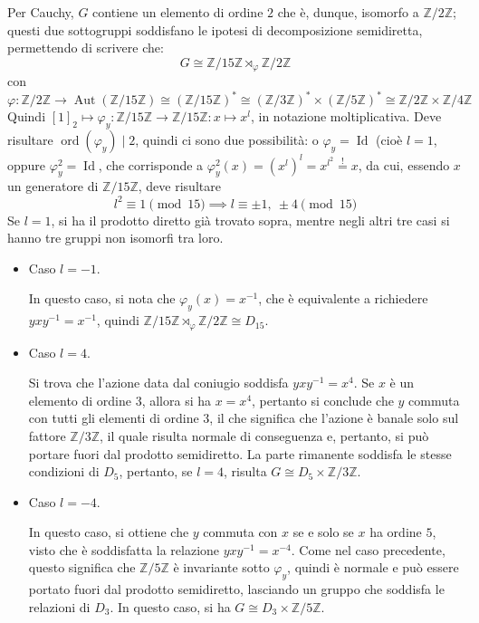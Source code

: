 \documentclass[11pt]{article}
\theoremstyle{style}
\numberwithin{equation}{subsection}
\begin{document}
Per Cauchy, $G$ contiene un elemento di ordine $2$ che \`e, dunque, isomorfo a $\mathbb{Z}/2\mathbb{Z}$; questi due sottogruppi soddisfano le ipotesi di decomposizione semidiretta, permettendo di scrivere che:
\[
G \cong \mathbb{Z}/15\mathbb{Z} \rtimes _\varphi  \mathbb{Z}/2\mathbb{Z}
\] 
con
\[
\varphi :\mathbb{Z}/2\mathbb{Z} \longrightarrow \operatorname{Aut} (\mathbb{Z}/15\mathbb{Z}) \cong (\mathbb{Z}/15\mathbb{Z})^*\cong (\mathbb{Z}/3\mathbb{Z})^* \times (\mathbb{Z}/5\mathbb{Z})^*\cong \mathbb{Z}/2\mathbb{Z} \times \mathbb{Z}/4\mathbb{Z}
\] 
Quindi $[1]_2\mapsto \varphi _y:\mathbb{Z}/15\mathbb{Z}\longrightarrow \mathbb{Z}/15\mathbb{Z} : x\longmapsto x^{l}$, in notazione moltiplicativa. 
Deve risultare $\operatorname{ord}(\varphi _y)  \mid 2$, quindi ci sono due possibilit\`a: o $\varphi _y = \operatorname{Id} $ (cio\`e $l=1$, oppure $\varphi _y^2 = \operatorname{Id} $, che corrisponde a $\varphi ^2_y (x) = (x^l)^l= x^{l^2} \stackrel{!}{=} x$, da cui, essendo $x$ un generatore di $\mathbb{Z}/15\mathbb{Z}$, deve risultare 
\[
l^2 \equiv 1 \pmod{15} \implies l \equiv \pm 1, \ \pm 4 \pmod{15} 
\] 
Se $l=1$, si ha il prodotto diretto gi\`a trovato sopra, mentre negli altri tre casi si hanno tre gruppi non isomorfi tra loro.
\begin{itemize}
	\item Caso $l=-1$.

		In questo caso, si nota che $\varphi _y(x) = x^{-1}$, che \`e equivalente a richiedere $yxy^{-1} = x^{-1}$, quindi $\mathbb{Z}/15\mathbb{Z}\rtimes _\varphi \mathbb{Z}/2\mathbb{Z}\cong D_{15}$.
	\item Caso $l = 4$.

		Si trova che l'azione data dal coniugio soddisfa $yxy^{-1}=x^4$.
		Se $x$ \`e un elemento di ordine $3$, allora si ha $x = x^4$, pertanto si conclude che $y$ commuta con tutti gli elementi di ordine $3$, il che significa che l'azione \`e banale solo sul fattore $\mathbb{Z}/3\mathbb{Z}$, il quale risulta normale di conseguenza e, pertanto, si pu\`o portare fuori dal prodotto semidiretto.
		La parte rimanente soddisfa le stesse condizioni di $D_5$, pertanto, se $l=4$, risulta $G\cong D_5\times \mathbb{Z}/3\mathbb{Z}$.
	\item Caso $l=-4$.

		In questo caso, si ottiene che $y$ commuta con $x$ se e solo se $x$ ha ordine $5$, visto che \`e soddisfatta la relazione $yxy^{-1}=x^{-4}$.
		Come nel caso precedente, questo significa che $\mathbb{Z}/5\mathbb{Z}$ \`e invariante sotto $\varphi _y$, quindi \`e normale e pu\`o essere portato fuori dal prodotto semidiretto, lasciando un gruppo che soddisfa le relazioni di $D_3$.
In questo caso, si ha $G \cong D_3 \times \mathbb{Z}/5\mathbb{Z}$.
\end{itemize}
\end{document}
